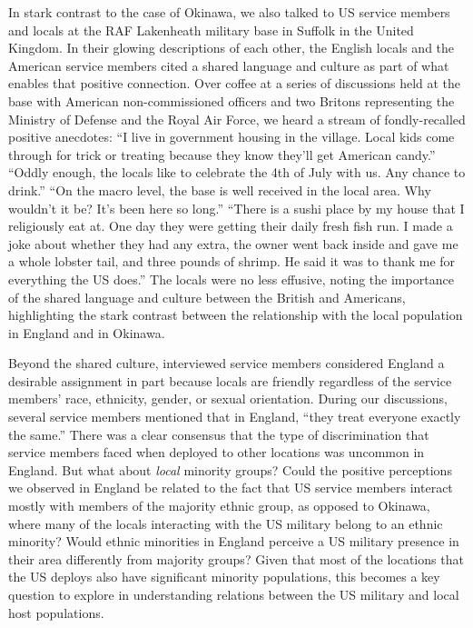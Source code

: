 In stark contrast to the case of Okinawa, we also talked to US service members and locals at the RAF Lakenheath military base in Suffolk in the United Kingdom. In their glowing descriptions of each other, the English locals and the American service members cited a shared language and culture as part of what enables that positive connection. Over coffee at a series of discussions held at the base with American non-commissioned officers and two Britons representing the Ministry of Defense and the Royal Air Force, we heard a stream of fondly-recalled positive anecdotes: ``I live in government housing in the village. Local kids come through for trick or treating because they know they'll get American candy.''\cite{rafsix20190719} ``Oddly enough, the locals like to celebrate the 4th of July with us. Any chance to drink.''\cite{rafeight20190719} ``On the macro level, the base is well received in the local area. Why wouldn’t it be? It's been here so long.''\cite{rafthree20190719} ``There is a sushi place by my house that I religiously eat at. One day they were getting their daily fresh fish run. I made a joke about whether they had any extra, the owner went back inside and gave me a whole lobster tail, and three pounds of shrimp. He said it was to thank me for everything the US does.''\cite{raffive20190719} The locals were no less effusive, noting the importance of the shared language and culture between the British and Americans, highlighting the stark contrast between the relationship with the local population in England and in Okinawa.\cite{councilone20190718}

Beyond the shared culture, interviewed service members considered England a desirable assignment in part because locals are friendly regardless of the service members' race, ethnicity, gender, or sexual orientation. During our discussions, several service members mentioned that in England, ``they treat everyone exactly the same.''\cite{raffive20190719}  There was a clear consensus that the type of discrimination that service members faced when deployed to other locations was uncommon in England. But what about \textit{local} minority groups?  Could the positive perceptions we observed in England be related to the fact that US service members interact mostly with members of the majority ethnic group, as opposed to Okinawa, where many of the locals interacting with the US military belong to an ethnic minority? Would ethnic minorities in England perceive a US military presence in their area differently from majority groups? Given that most of the locations that the US deploys also have significant minority populations, this becomes a key question to explore in understanding relations between the US military and local host populations. 

